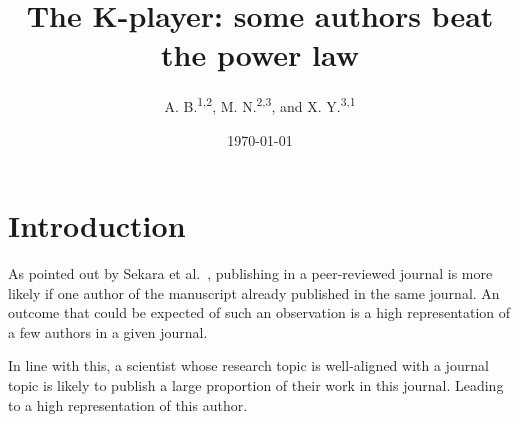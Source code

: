 \documentclass[aps,prl,floatfix,twocolumn]{revtex4-1}
\begin{document}
\title{The K-player: some authors beat the power law}

\author{A. B.\textsuperscript{1,2}, M. N.\textsuperscript{2,3}, and X. Y.\textsuperscript{3,1}}

\date{\today}

\begin{abstract}
 \textcolor{red}{\lipsum[1]}
\end{abstract}

\maketitle

\section{Introduction} 


As pointed out by Sekara et al.~\cite{Sek18}, publishing in a peer-reviewed journal is more likely if one author of the manuscript already published in the same journal.
An outcome that could be expected of such an observation is a high representation of a few authors in a given journal. 

In line with this, a scientist whose research topic is well-aligned with a journal topic is likely to publish a large proportion of their work in this journal.
Leading to a high representation of this author. 
\end{document}
